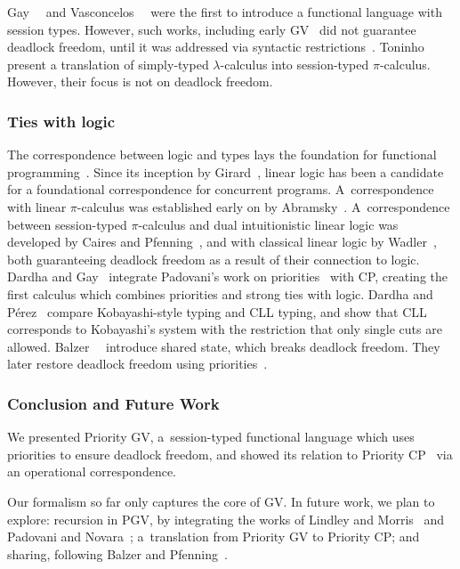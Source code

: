 \documentclass[main.tex]{subfiles}
\begin{document}
Gay~\etal~\cite{gaynagarajan03} and Vasconcelos~\etal~\cite{vasconcelosravara04,vasconcelosgay06} were the first to introduce a functional language with session types. However, such works, including early GV~\cite{gayvasconcelos10,gayvasconcelos12} did not guarantee deadlock freedom, until it was addressed via syntactic restrictions~\cite{lindleymorris15,wadler15}. Toninho~\etal~\cite{toninhocaires12} present a translation of simply-typed $\lambda$-calculus into session-typed $\pi$-calculus. However, their focus is not on deadlock freedom.

\subsubsection*{Ties with logic}
The correspondence between logic and types lays the foundation for functional programming~\cite{wadler15}. Since its inception by Girard~\cite{girard87}, linear logic has been a candidate for a foundational correspondence for concurrent programs. A~correspondence with linear $\pi$-calculus was established early on by Abramsky~\cite{abramsky94,bellinscott94}. A~correspondence between session-typed $\pi$-calculus and dual intuitionistic linear logic was developed by Caires and Pfenning~\cite[$\pi\text{DILL}$]{cairespfenning10}, and with classical linear logic by Wadler~\cite[CP]{wadler15}, both guaranteeing deadlock freedom as a result of their connection to logic. Dardha and Gay~\cite[PCP]{dardhagay18} integrate Padovani's work on priorities~\cite{padovani14} with CP, creating the first calculus which combines priorities and strong ties with logic. Dardha and P\'{e}rez~\cite{dardhaperez15} compare Kobayashi-style typing and CLL typing, and show that CLL corresponds to Kobayashi's system with the restriction that only single cuts are allowed. Balzer~\etal~\cite[$\text{SILL}_S$]{balzerpfenning17} introduce shared state, which breaks deadlock freedom. They later restore deadlock freedom using priorities~\cite[$\text{SILL}_{S+}$]{balzertoninho19}.

\subsubsection*{Conclusion and Future Work}
We presented Priority GV, a~session-typed functional language which uses priorities to ensure deadlock freedom, and showed its relation to Priority CP~\cite{dardhagay18} via an operational correspondence.

Our formalism so far only captures the core of GV. In future work, we plan to explore: recursion in PGV, by integrating the works of Lindley and Morris~\cite{lindleymorris16} and Padovani and Novara~\cite{padovaninovara15}; a~translation from Priority GV to Priority CP; and sharing, following Balzer and Pfenning~\cite{balzerpfenning17}.
\end{document}
